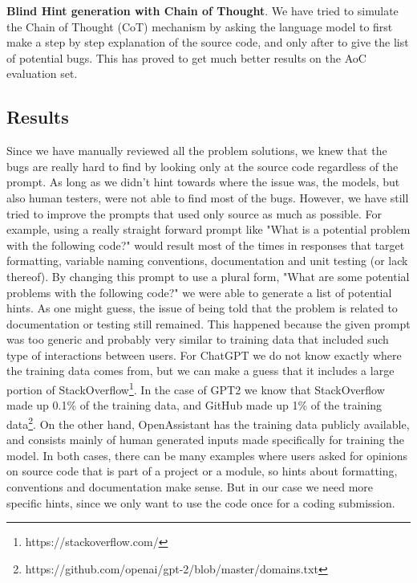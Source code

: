 \documentclass[12pt,a4paper]{report}
\begin{document}
\textbf{Blind Hint generation with Chain of Thought}. We have tried to simulate the Chain of Thought (CoT) mechanism by asking the language model to first make a step by step explanation of the source code, and only after to give the list of potential bugs. This has proved to get much better results on the AoC evaluation set.

\subsection{Results}

Since we have manually reviewed all the problem solutions, we knew that the bugs are really hard to find by looking only at the source code regardless of the prompt. As long as we didn't hint towards where the issue was, the models, but also human testers, were not able to find most of the bugs. However, we have still tried to improve the prompts that used only source as much as possible. For example, using a really straight forward prompt like "What is a potential problem with the following code?" would result most of the times in responses that target formatting, variable naming conventions, documentation and unit testing (or lack thereof). By changing this prompt to use a plural form, "What are some potential problems with the following code?" we were able to generate a list of potential hints. As one might guess, the issue of being told that the problem is related to documentation or testing still remained. This happened because the given prompt was too generic and probably very similar to training data that included such type of interactions between users. For ChatGPT we do not know exactly where the training data comes from, but we can make a guess that it includes a large portion of StackOverflow\footnote{https://stackoverflow.com/}. In the case of GPT2 we know that StackOverflow made up 0.1\% of the training data, and GitHub made up 1\% of the training data\footnote{https://github.com/openai/gpt-2/blob/master/domains.txt}. On the other hand, OpenAssistant has the training data publicly available, and consists mainly of human generated inputs made specifically for training the model. In both cases, there can be many examples where users asked for opinions on source code that is part of a project or a module, so hints about formatting, conventions and documentation make sense. But in our case we need more specific hints, since we only want to use the code once for a coding submission.
\end{document}
